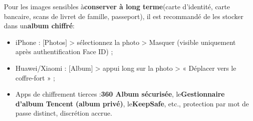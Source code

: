 Pour les images sensibles à\textbf{conserver à long terme}(carte d'identité, carte bancaire, scans de livret de famille, passeport), il est recommandé de les stocker dans un\textbf{album chiffré}:

\begin{itemize}
  \item iPhone : [Photos] > sélectionnez la photo > Masquer (visible uniquement après authentification Face ID) ;
  \item Huawei/Xiaomi : [Album] > appui long sur la photo > « Déplacer vers le coffre-fort » ;
  \item Apps de chiffrement tierces :\textbf{360 Album sécurisée}, le\textbf{Gestionnaire d'album Tencent (album privé)}, le\textbf{KeepSafe}, etc., protection par mot de passe distinct, discrétion accrue.
\end{itemize}
